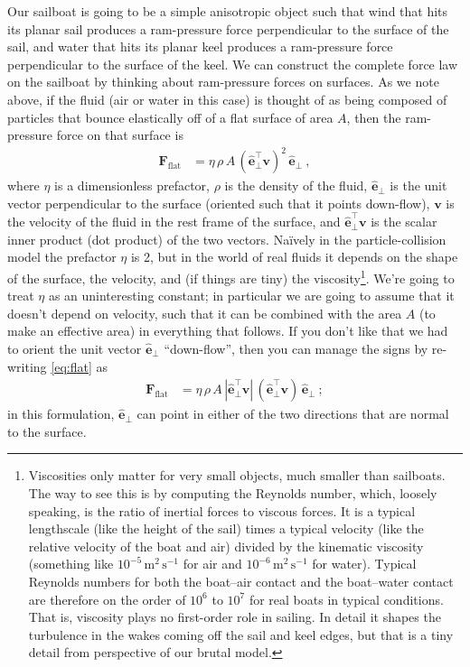 \documentclass[letterpaper]{article}
\renewcommand{\vec}[1]{\boldsymbol{#1}}
\newcommand{\uvec}{\vec{\hat{e}}}
\renewcommand{\flat}{\text{flat}}
\newcommand{\mmps}{\mathrm{m^2\,s^{-1}}}
\begin{document}
Our sailboat is going to be a simple anisotropic object such that wind that hits its planar sail produces a ram-pressure force perpendicular to the surface of the sail,
and water that hits its planar keel produces a ram-pressure force perpendicular to the surface of the keel.
We can construct the complete force law on the sailboat by thinking about ram-pressure forces on surfaces.
As we note above, if the fluid (air or water in this case) is thought of as being composed of particles that bounce elastically off of a flat surface of area $A$, then the ram-pressure force on that surface is
\begin{align}\label{eq:flat}
    \vec{F}_\flat &= \eta\,\rho\,A\,(\uvec_\perp^\top\vec{v})^2\,\uvec_\perp ~,
\end{align}
where $\eta$ is a dimensionless prefactor, $\rho$ is the density of the fluid, $\uvec_\perp$ is the unit vector perpendicular to the surface (oriented such that it points down-flow), $\vec{v}$ is the velocity of the fluid in the rest frame of the surface, and $\uvec_\perp^\top\vec{v}$ is the scalar inner product (dot product) of the two vectors.
Na\"ively in the particle-collision model the prefactor $\eta$ is 2, but in the world of real fluids it depends on the shape of the surface, the velocity, and (if things are tiny) the viscosity\footnote{%
Viscosities only matter for very small objects, much smaller than sailboats. The way to see this is by computing the Reynolds number, which, loosely speaking, is the ratio of inertial forces to viscous forces. It is a typical lengthscale (like the height of the sail) times a typical velocity (like the relative velocity of the boat and air) divided by the kinematic viscosity (something like $10^{-5}\,\mmps$ for air and $10^{-6}\,\mmps$ for water). Typical Reynolds numbers for both the boat--air contact and the boat--water contact are therefore on the order of $10^6$ to $10^7$ for real boats in typical conditions. That is, viscosity plays no first-order role in sailing. In detail it shapes the turbulence in the wakes coming off the sail and keel edges, but that is a tiny detail from perspective of our brutal model.}.
We're going to treat $\eta$ as an uninteresting constant; in particular we are going to assume that it doesn't depend on velocity, such that it can be combined with the area $A$ (to make an effective area) in everything that follows.
If you don't like that we had to orient the unit vector $\uvec_\perp$ ``down-flow'', then you can manage the signs by re-writing \eqref{eq:flat} as
\begin{align}
    \vec{F}_\flat &= \eta\,\rho\,A\,|\uvec_\perp^\top\vec{v}|\,(\uvec_\perp^\top\vec{v})\,\uvec_\perp ~;
\end{align}
in this formulation, $\uvec_\perp$ can point in either of the two directions that are normal to the surface.
\end{document}
